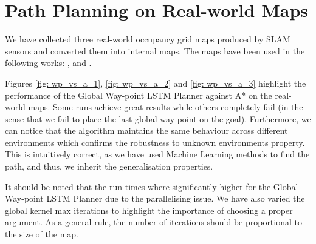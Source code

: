\newpage

\section{Path Planning on Real-world Maps}

We have collected three real-world occupancy grid maps produced by SLAM sensors and converted them into internal maps. The maps have been used in the following works: \cite{first_map}, \cite{second_map} and \cite{third_map}.

Figures \ref{fig: wp_vs_a_1}, \ref{fig: wp_vs_a_2} and \ref{fig: wp_vs_a_3} highlight the performance of the Global Way-point LSTM Planner against A* on the real-world maps. Some runs achieve great results while others completely fail (in the sense that we fail to place the last global way-point on the goal). Furthermore, we can notice that the algorithm maintains the same behaviour across different environments which confirms the robustness to unknown environments property. This is intuitively correct, as we have used Machine Learning methods to find the path, and thus, we inherit the generalisation properties.

It should be noted that the run-times where significantly higher for the Global Way-point LSTM Planner due to the parallelising issue. We have also varied the global kernel max iterations to highlight the importance of choosing a proper argument. As a general rule, the number of iterations should be proportional to the size of the map.

\pagebreak


